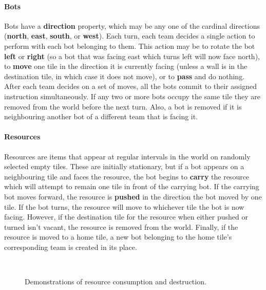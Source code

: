 \documentclass[a4paper,10pt]{article}
\begin{document}
\paragraph{Bots}
Bots have a \textbf{direction} property, which may be any one of the cardinal directions (\textbf{north}, \textbf{east}, \textbf{south}, or \textbf{west}). Each turn, each team decides a single action to perform with each bot belonging to them. This action may be to rotate the bot \textbf{left} or \textbf{right} (so a bot that was facing east which turns left will now face north), to \textbf{move} one tile in the direction it is currently facing (unless a wall is in the destination tile, in which case it does not move), or to \textbf{pass} and do nothing. After each team decides on a set of moves, all the bots commit to their assigned instruction simultaneously. If any two or more bots occupy the same tile they are removed from the world before the next turn. Also, a bot is removed if it is neighbouring another bot of a different team that is facing it.


\paragraph{Resources}
Resources are items that appear at regular intervals in the world on randomly selected empty tiles. These are initially stationary, but if a bot appears on a neighbouring tile and faces the resource, the bot begins to \textbf{carry} the resource which will attempt to remain one tile in front of the carrying bot. If the carrying bot moves forward, the resource is \textbf{pushed} in the direction the bot moved by one tile. If the bot turns, the resource will move to whichever tile the bot is now facing. However, if the destination tile for the resource when either pushed or turned isn't vacant, the resource is removed from the world. Finally, if the resource is moved to a home tile, a new bot belonging to the home tile's corresponding team is created in its place.

\begin{figure}[ht]
  \centering
  \mbox{
    \quad
  }
  \caption{Demonstrations of resource consumption and destruction.}
  \vspace{-5mm}
\end{figure}
\end{document}

